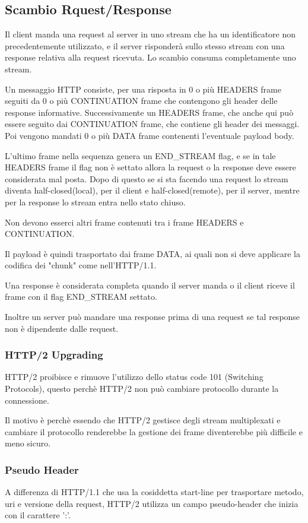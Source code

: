 \documentclass[12pt, a4paper]{article} %
\begin{document}
\subsection{Scambio Rquest/Response}
Il client manda una request al server in uno stream che ha un identificatore non precedentemente utilizzato, e il server risponderà sullo stesso stream con una response relativa alla request ricevuta.
Lo scambio consuma completamente uno stream.

Un messaggio HTTP consiste, per una risposta in 0 o più HEADERS frame seguiti da 0 o più CONTINUATION frame che contengono gli header delle response informative.
Successivamente un HEADERS frame, che anche qui può essere seguito dai CONTINUATION frame, che contiene gli header dei messaggi.
Poi vengono mandati 0 o più DATA frame contenenti l'eventuale payload body.

L'ultimo frame nella sequenza genera un END\_STREAM flag, e se in tale HEADERS frame il flag non è settato allora la request o la response deve essere considerata mal posta.
Dopo di questo se si sta facendo una request lo stream diventa half-closed(local), per il client e half-closed(remote), per il server, mentre per la response lo stream entra nello stato chiuso.

Non devono esserci altri frame contenuti tra i frame HEADERS e CONTINUATION.

Il payload è quindi trasportato dai frame DATA, ai quali non si deve applicare la codifica dei "chunk" come nell'HTTP/1.1.

Una response è considerata completa quando il server manda o il client riceve il frame con il flag END\_STREAM settato.

Inoltre un server può mandare una response prima di una request se tal response non è dipendente dalle request.

\subsubsection{HTTP/2 Upgrading}
HTTP/2 proibisce e rimuove l'utilizzo dello status code 101 (Switching Protocols), questo perchè HTTP/2 non può cambiare protocollo durante la connessione.

Il motivo è perchè essendo che HTTP/2 gestisce degli stream multiplexati e cambiare il protocollo renderebbe la gestione dei frame diventerebbe più difficile e meno sicuro.

\subsubsection{Pseudo Header}
A differenza di HTTP/1.1 che usa la cosiddetta start-line per trasportare metodo, uri e versione della request, HTTP/2 utilizza un campo pseudo-header che inizia con il carattere ':'.
\end{document}
